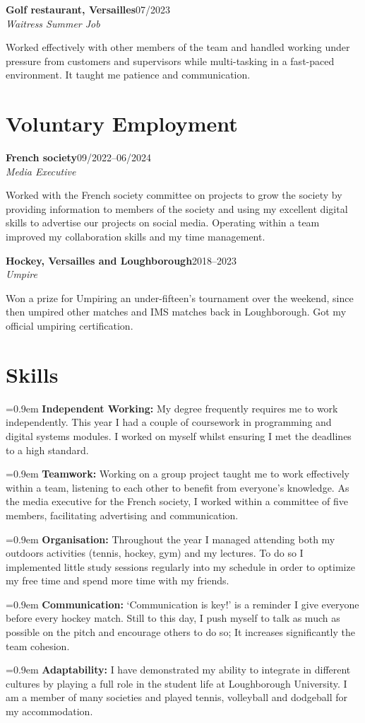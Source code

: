 \documentclass[10pt,a4paper]{article}
\newcommand{\cvitem}[2]{%
  \hangindent=0.9em\hangafter=1
  \textbf{#1} #2\par
}
\newcommand{\cventry}[4]{%
  \textbf{#1}\hfill \textcolor{textgray}{#2}\\[-0.5pt]
  \textit{#3}\hfill \textit{#4}\par
}
\begin{document}
\cventry{Golf restaurant, Versailles}{07/2023}{Waitress Summer Job}{}
Worked effectively with other members of the team and handled working under pressure from customers and supervisors while multi-tasking in a fast-paced environment. It taught me patience and communication.

\section{Voluntary Employment}
\cventry{French society}{09/2022--06/2024}{Media Executive}{}
Worked with the French society committee on projects to grow the society by providing information to members of the society and using my excellent digital skills to advertise our projects on social media. Operating within a team improved my collaboration skills and my time management.

\cventry{Hockey, Versailles and Loughborough}{2018--2023}{Umpire}{}
Won a prize for Umpiring an under-fifteen's tournament over the weekend, since then umpired other matches and IMS matches back in Loughborough. Got my official umpiring certification.

\section{Skills}
\cvitem{Independent Working:}{My degree frequently requires me to work independently. This year I had a couple of coursework in programming and digital systems modules. I worked on myself whilst ensuring I met the deadlines to a high standard.}
\cvitem{Teamwork:}{Working on a group project taught me to work effectively within a team, listening to each other to benefit from everyone's knowledge. As the media executive for the French society, I worked within a committee of five members, facilitating advertising and communication.}
\cvitem{Organisation:}{Throughout the year I managed attending both my outdoors activities (tennis, hockey, gym) and my lectures. To do so I implemented little study sessions regularly into my schedule in order to optimize my free time and spend more time with my friends.}
\cvitem{Communication:}{`Communication is key!' is a reminder I give everyone before every hockey match. Still to this day, I push myself to talk as much as possible on the pitch and encourage others to do so; It increases significantly the team cohesion.}
\cvitem{Adaptability:}{I have demonstrated my ability to integrate in different cultures by playing a full role in the student life at Loughborough University. I am a member of many societies and played tennis, volleyball and dodgeball for my accommodation.}
\end{document}
